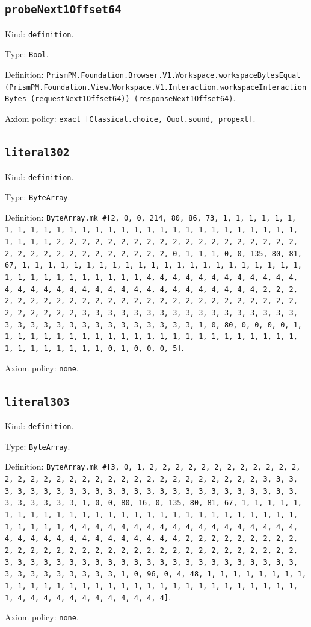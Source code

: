 \documentclass[11pt]{article}
\begin{document}
\subsection*{\texttt{probeNext1Offset64}}
\noindent Kind: \texttt{definition}.\par
\noindent Type: \texttt{Bool}.\par
\noindent Definition: \texttt{PrismPM.Foundation.Browser.V1.Workspace.workspaceBytesEqual (PrismPM.Foundation.View.Workspace.V1.Interaction.workspaceInteractionBytes (requestNext1Offset64)) (responseNext1Offset64)}.\par
\noindent Axiom policy: \texttt{exact [Classical.choice, Quot.sound, propext]}.\par
\subsection*{\texttt{literal302}}
\noindent Kind: \texttt{definition}.\par
\noindent Type: \texttt{ByteArray}.\par
\noindent Definition: \texttt{ByteArray.mk \#[2, 0, 0, 214, 80, 86, 73, 1, 1, 1, 1, 1, 1, 1, 1, 1, 1, 1, 1, 1, 1, 1, 1, 1, 1, 1, 1, 1, 1, 1, 1, 1, 1, 1, 1, 1, 1, 1, 1, 1, 2, 2, 2, 2, 2, 2, 2, 2, 2, 2, 2, 2, 2, 2, 2, 2, 2, 2, 2, 2, 2, 2, 2, 2, 2, 2, 2, 2, 2, 2, 2, 2, 0, 1, 1, 1, 0, 0, 135, 80, 81, 67, 1, 1, 1, 1, 1, 1, 1, 1, 1, 1, 1, 1, 1, 1, 1, 1, 1, 1, 1, 1, 1, 1, 1, 1, 1, 1, 1, 1, 1, 1, 1, 1, 1, 4, 4, 4, 4, 4, 4, 4, 4, 4, 4, 4, 4, 4, 4, 4, 4, 4, 4, 4, 4, 4, 4, 4, 4, 4, 4, 4, 4, 4, 4, 4, 4, 2, 2, 2, 2, 2, 2, 2, 2, 2, 2, 2, 2, 2, 2, 2, 2, 2, 2, 2, 2, 2, 2, 2, 2, 2, 2, 2, 2, 2, 2, 2, 2, 3, 3, 3, 3, 3, 3, 3, 3, 3, 3, 3, 3, 3, 3, 3, 3, 3, 3, 3, 3, 3, 3, 3, 3, 3, 3, 3, 3, 3, 3, 3, 3, 1, 0, 80, 0, 0, 0, 0, 1, 1, 1, 1, 1, 1, 1, 1, 1, 1, 1, 1, 1, 1, 1, 1, 1, 1, 1, 1, 1, 1, 1, 1, 1, 1, 1, 1, 1, 1, 1, 1, 0, 1, 0, 0, 0, 5]}.\par
\noindent Axiom policy: \texttt{none}.\par
\subsection*{\texttt{literal303}}
\noindent Kind: \texttt{definition}.\par
\noindent Type: \texttt{ByteArray}.\par
\noindent Definition: \texttt{ByteArray.mk \#[3, 0, 1, 2, 2, 2, 2, 2, 2, 2, 2, 2, 2, 2, 2, 2, 2, 2, 2, 2, 2, 2, 2, 2, 2, 2, 2, 2, 2, 2, 2, 2, 2, 2, 2, 3, 3, 3, 3, 3, 3, 3, 3, 3, 3, 3, 3, 3, 3, 3, 3, 3, 3, 3, 3, 3, 3, 3, 3, 3, 3, 3, 3, 3, 3, 3, 3, 1, 0, 0, 80, 16, 0, 135, 80, 81, 67, 1, 1, 1, 1, 1, 1, 1, 1, 1, 1, 1, 1, 1, 1, 1, 1, 1, 1, 1, 1, 1, 1, 1, 1, 1, 1, 1, 1, 1, 1, 1, 1, 1, 4, 4, 4, 4, 4, 4, 4, 4, 4, 4, 4, 4, 4, 4, 4, 4, 4, 4, 4, 4, 4, 4, 4, 4, 4, 4, 4, 4, 4, 4, 4, 4, 2, 2, 2, 2, 2, 2, 2, 2, 2, 2, 2, 2, 2, 2, 2, 2, 2, 2, 2, 2, 2, 2, 2, 2, 2, 2, 2, 2, 2, 2, 2, 2, 3, 3, 3, 3, 3, 3, 3, 3, 3, 3, 3, 3, 3, 3, 3, 3, 3, 3, 3, 3, 3, 3, 3, 3, 3, 3, 3, 3, 3, 3, 3, 3, 1, 0, 96, 0, 4, 48, 1, 1, 1, 1, 1, 1, 1, 1, 1, 1, 1, 1, 1, 1, 1, 1, 1, 1, 1, 1, 1, 1, 1, 1, 1, 1, 1, 1, 1, 1, 1, 1, 4, 4, 4, 4, 4, 4, 4, 4, 4, 4, 4, 4]}.\par
\noindent Axiom policy: \texttt{none}.\par
\end{document}
